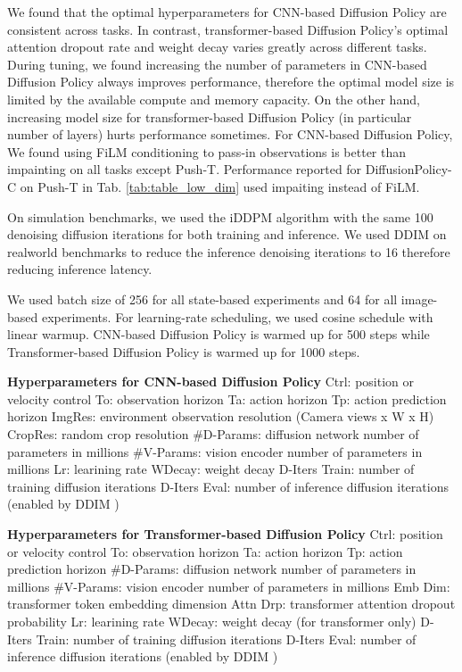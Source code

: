 We found that the optimal hyperparameters for CNN-based Diffusion Policy are consistent across tasks. In contrast, transformer-based Diffusion Policy's optimal attention dropout rate and weight decay varies greatly across different tasks. During tuning, we found increasing the number of parameters in CNN-based Diffusion Policy always improves performance, therefore the optimal model size is limited by the available compute and memory capacity. On the other hand, increasing model size for transformer-based Diffusion Policy (in particular number of layers) hurts performance sometimes. For CNN-based Diffusion Policy, We found using FiLM conditioning to pass-in observations is better than impainting on all tasks except Push-T. Performance reported for DiffusionPolicy-C on Push-T in Tab. \ref{tab:table_low_dim} used impaiting instead of FiLM.

On simulation benchmarks, we used the iDDPM algorithm \cite{nichol2021improved} with the same 100 denoising diffusion iterations for both training and inference. We used DDIM \cite{song2021ddim} on realworld benchmarks to reduce the inference denoising iterations to 16 therefore reducing inference latency.

We used batch size of 256 for all state-based experiments and 64 for all image-based experiments. For learning-rate scheduling, we used cosine schedule with linear warmup. CNN-based Diffusion Policy is warmed up for 500 steps while Transformer-based Diffusion Policy is warmed up for 1000 steps.

\begin{table}
\centering

\caption{
\textbf{Hyperparameters for CNN-based Diffusion Policy}
\label{tab:hparam_cnn}
Ctrl: position or velocity control
To: observation horizon
Ta: action horizon
Tp: action prediction horizon
ImgRes: environment observation resolution (Camera views x W x H)
CropRes: random crop resolution
\#D-Params: diffusion network number of parameters in millions
\#V-Params: vision encoder number of parameters in millions
Lr: learining rate
WDecay: weight decay
D-Iters Train: number of training diffusion iterations
D-Iters Eval: number of inference diffusion iterations (enabled by DDIM \cite{song2021ddim})
}

\vspace{4mm}
\centering

\caption{
\textbf{Hyperparameters for Transformer-based Diffusion Policy}
\label{tab:hparam_transformer}
Ctrl: position or velocity control
To: observation horizon
Ta: action horizon
Tp: action prediction horizon
\#D-Params: diffusion network number of parameters in millions
\#V-Params: vision encoder number of parameters in millions
Emb Dim: transformer token embedding dimension
Attn Drp: transformer attention dropout probability
Lr: learining rate
WDecay: weight decay (for transformer only)
D-Iters Train: number of training diffusion iterations
D-Iters Eval: number of inference diffusion iterations (enabled by DDIM \cite{song2021ddim})
}
\vspace{-5mm}
\end{table}

